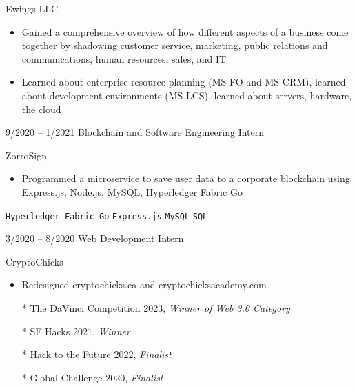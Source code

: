 \documentclass[9pt]{developercv} %
\begin{document}
\begin{entrylist}
{        Ewings LLC
        \vspace{5pt}
        \begin{itemize}[noitemsep,topsep=0pt,parsep=0pt,partopsep=0pt, leftmargin=-1pt]
            \item Gained a comprehensive overview of how different aspects of a business come together by shadowing customer service, marketing, public relations and communications, human resources, sales, and IT
            \item Learned about enterprise resource planning (MS FO and MS CRM), learned about development environments (MS LCS), learned about servers, hardware, the cloud
        \end{itemize} 
        }

        \entry
		{9/2020 -- 1/2021}
		{Blockchain and Software Engineering Intern}
		{}
		{\vspace{-10pt}
  
        ZorroSign
        \vspace{5pt}
        \begin{itemize}[noitemsep,topsep=0pt,parsep=0pt,partopsep=0pt, leftmargin=-1pt]
            \item Programmed a microservice to save user data to a corporate blockchain using Express.js, Node.js, MySQL, Hyperledger Fabric Go
        \end{itemize}
        \vspace{5pt}
        \texttt{Hyperledger Fabric Go} \slashsep \texttt{Express.js} \slashsep \texttt{MySQL} \slashsep \texttt{SQL}}

        \entry
		{3/2020 -- 8/2020}
		{Web Development Intern}
		{}
		{\vspace{-10pt}
  
        CryptoChicks
        \vspace{5pt}
        \begin{itemize}[noitemsep,topsep=0pt,parsep=0pt,partopsep=0pt, leftmargin=-1pt]
            \item Redesigned cryptochicks.ca and cryptochicksacademy.com
        \end{itemize} 
        }
\end{entrylist}

\begin{enumerate}
    \item[*] The DaVinci Competition 2023, \textit{Winner of Web 3.0 Category}
    \item[*] SF Hacks 2021, \textit{Winner}
    \item[*] Hack to the Future 2022, \textit{Finalist}
    \item[*] Global Challenge 2020, \textit{Finalist}
\end{enumerate}
\end{document}
